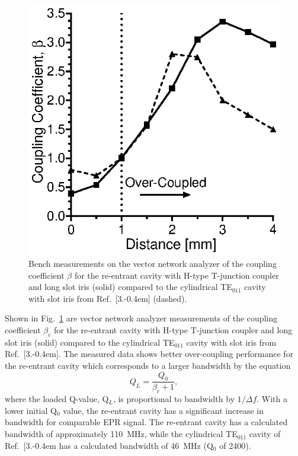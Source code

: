 \begin{figure}[htb]\centering
 \includegraphics{Kapitel/Ch2-Images/08-couplingcoeff.eps}
 \caption[Bench measurements of the coupling coefficient.]{Bench measurements on the vector network analyzer of the coupling coefficient $\beta$  for the re-entrant \cylTE{} cavity with H-type T-junction coupler and long slot iris (solid) compared to the cylindrical TE$_{011}$ cavity with slot iris from Ref.~[3.\kern-0.4em] (dashed).}
 \label{Ch2-fig:coupling}
\end{figure}

Shown in Fig.~\ref{Ch2-fig:coupling} are vector network analyzer measurements of the coupling coefficient $\beta_c$ for the re-entrant \cylTE{} cavity with H-type T-junction coupler and long slot iris (solid) compared to the cylindrical TE$_{011}$ cavity with slot iris from Ref.~[3.\kern-0.4em]. The measured data shows better over-coupling performance for the re-entrant \cylTE{} cavity which corresponds to a larger bandwidth by the equation
\begin{equation}
    Q_L = \frac{Q_0}{\beta_c+1}, \label{q0eqn}
\end{equation}
where the loaded Q-value, Q$_L$, is proportional to bandwidth by $1/\Delta f$. \cite{ramo1984fields} With a lower initial Q$_0$ value, the re-entrant \cylTE{} cavity has a significant increase in bandwidth for comparable EPR signal. The re-entrant \cylTE{} cavity has a calculated bandwidth of approximately 110~MHz, while the cylindrical TE$_{011}$ cavity of Ref.~[3.\kern-0.4em has a calculated bandwidth of 46~MHz (Q$_0$ of 2400).

